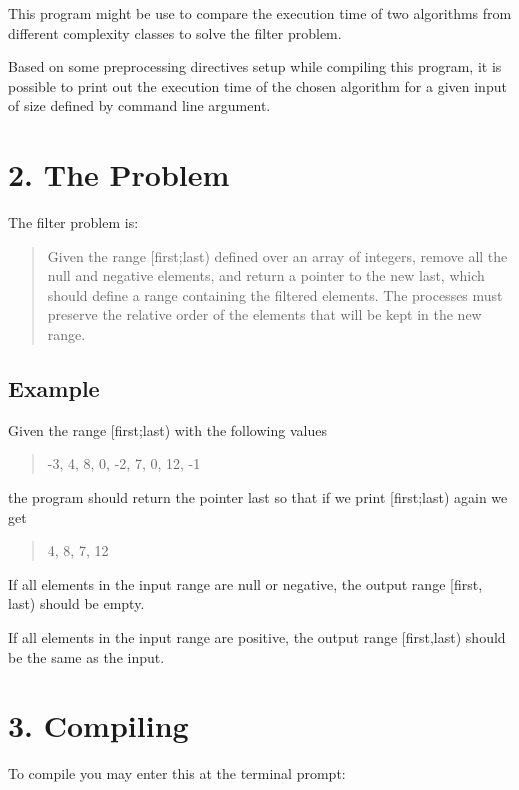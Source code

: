 This program might be use to compare the execution time of two algorithms from different complexity classes to solve the filter problem.

Based on some preprocessing directives setup while compiling this program, it is possible to print out the execution time of the chosen algorithm for a given input of size defined by command line argument.

\section*{2. The Problem}

The filter problem is\+: \begin{quote}
Given the range {\ttfamily \mbox{[}first;last)} defined over an array of integers, remove all the null and negative elements, and return a pointer to the new {\ttfamily last}, which should define a range containing the filtered elements. The processes must preserve the relative order of the elements that will be kept in the new range. \end{quote}


\subsection*{Example}

Given the range {\ttfamily \mbox{[}first;last)} with the following values \begin{quote}
-\/3, 4, 8, 0, -\/2, 7, 0, 12, -\/1 \end{quote}


the program should return the pointer {\ttfamily last} so that if we print {\ttfamily \mbox{[}first;last)} again we get \begin{quote}
4, 8, 7, 12 \end{quote}


If all elements in the input range are null or negative, the output range {\ttfamily \mbox{[}first, last)} should be empty.

If all elements in the input range are positive, the output range {\ttfamily \mbox{[}first,last)} should be the same as the input.

\section*{3. Compiling}

To compile you may enter this at the terminal prompt\+:


\begin{DoxyCode}{0}
\end{DoxyCode}


